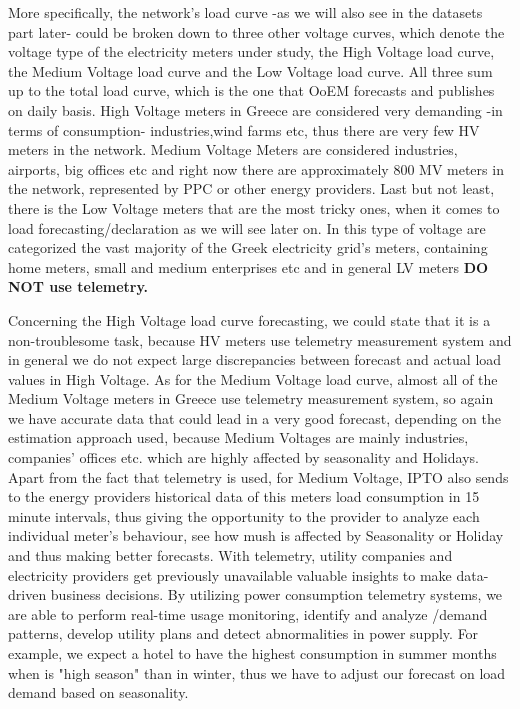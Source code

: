 \par More specifically, the network's load curve -as we will also see in the datasets part later- could be broken down to three other voltage curves, which denote the voltage type of the electricity meters under study, the High Voltage load curve, the Medium Voltage load curve and the Low Voltage load curve. All three sum up to the total load curve, which is the one that OoEM forecasts and publishes on daily basis. High Voltage meters in Greece are considered very demanding -in terms of consumption- industries,wind farms etc, thus there  are very few HV meters in the network. Medium Voltage Meters are considered industries, airports, big offices etc and right now there are approximately 800 MV meters in the network, represented by PPC or other energy providers. Last but not least, there is the Low Voltage meters that are the most tricky ones, when it comes to load forecasting/declaration as we will see later on. In this type of voltage are categorized the vast majority of the Greek electricity grid's meters, containing home meters, small and medium enterprises etc and in general LV meters \textbf{DO NOT use telemetry.}
\par Concerning the High Voltage load curve forecasting, we could state that it is a non-troublesome task, because HV meters use telemetry measurement system and in general we do not expect large discrepancies between forecast and actual load values in High Voltage. As for the Medium Voltage load curve, almost all of the Medium Voltage meters in Greece use telemetry measurement system, so again we have accurate data that could lead in a very good forecast, depending on the estimation approach used, because Medium Voltages are mainly industries, companies' offices etc. which are highly affected by seasonality and Holidays. Apart from the fact that telemetry is used, for Medium Voltage, IPTO also sends to the energy providers historical data of this meters load consumption in 15 minute intervals, thus giving the opportunity to the provider to analyze each individual meter's behaviour, see how mush is affected by Seasonality or Holiday and thus making better forecasts. With telemetry, utility companies and electricity providers get previously unavailable valuable insights to make data-driven business decisions. By utilizing power consumption telemetry systems, we are able to perform real-time usage monitoring, identify and analyze /demand patterns, develop utility plans and detect abnormalities in power supply. For example, we expect a hotel to have the highest consumption in summer months when is "high season" than in winter, thus we have to adjust our forecast on load demand based on seasonality. 
